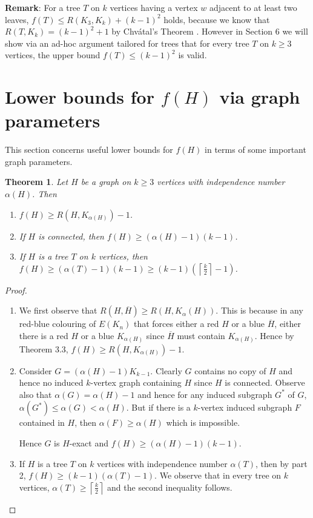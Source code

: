 \documentclass[a4paper,12pt]{article}
\newtheorem{theorem}{Theorem}[section]
\begin{document}
\noindent \textbf{Remark}:   For a tree $T$ on $k$ vertices having a vertex $w$ adjacent to at least two leaves, $ f(T) \leq R(K_3,K_k) + (k-1)^2$ holds,  because we know that $R(T,K_k) = ( k-1)^2 +1$ by Chv\'atal's Theorem \cite{Chvtal1977TreecompleteGR}.  However in Section 6 we will show via an ad-hoc argument tailored for trees  that for every tree $T$ on $k \geq 3$ vertices, the upper bound $ f(T) \leq ( k-1)^2$ is valid. 

 
 
\section{Lower bounds for $f(H)$ via graph parameters}
\label{s:LB}
This section concerns useful lower bounds for $f(H)$ in terms of some important graph parameters.

\begin{theorem}\label{treethree}
Let $H$ be a graph on $k\geq 3$ vertices with independence number $\alpha(H)$.  Then 
\begin{enumerate}
\item{$f(H) \geq R(H,K_{\alpha(H)}) - 1$.  }
\item{If $H$ is connected, then  $f(H)  \geq (\alpha(H) - 1)(k-1)$.}
\item{If $H$ is a tree $T$ on $k$ vertices, then $f(H) \geq (\alpha(T)-1)(k-1) \geq
 (k-1)(\left \lceil \frac{k}{2} \right \rceil -1)$}.
\end{enumerate}
\end{theorem}
\begin{proof}
$\mbox{ }$
\begin{enumerate}
\item{
We first observe that  $R(H,\overline{H}) \geq R(H,K_{\alpha}(H))$.  This is because in any red-blue colouring of $E(K_n)$  that forces  either a red $H$ or a blue $\overline{H}$, either there is a red $H$ or a blue $K_{\alpha(H)}$ since $\overline{H}$ must contain $K_{\alpha(H)}$.  Hence by Theorem 3.3, $f(H) \geq R(H, K_{\alpha(H)}) -1$.  }
\item{Consider $G = (\alpha(H) - 1)K_{k-1}$. Clearly $G$ contains no copy of $H$ and hence no  induced $k$-vertex graph containing $H$ since $H$ is connected.  Observe also that $\alpha(G) = \alpha(H)-1$ and hence for any induced subgraph $G^*$ of $G$, $\alpha(G^*) \leq \alpha(G) < \alpha(H)$.  But if there is a $k$-vertex induced subgraph $F$ contained in $H$, then $\alpha(F)  \geq \alpha(H)$ which is impossible.

Hence $G$ is $H$-exact and $f(H)  \geq (\alpha(H) - 1)(k-1)$.}
\item{If $H$ is a tree $T$ on  $k$ vertices with independence number $\alpha(T)$, then by part 2, $f(H) \geq (k - 1)(\alpha(T) - 1)$. We observe that in every tree on $k$ vertices,   $\alpha(T)  \geq  \left \lceil \frac{k}{2} \right \rceil$ and the second inequality follows.}
\end{enumerate}
\end{proof}  
 
\end{document}
